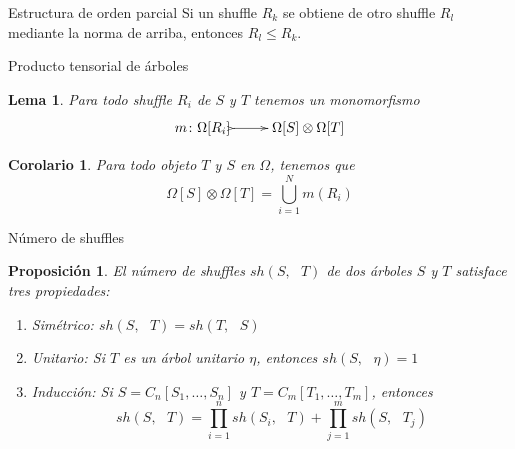 \documentclass[12pt,aspectratio=169]{beamer}
\numberwithin{equation}{section}
\newtheorem{prop}[teo]{Proposici\'on}
\newtheorem{corol}[teo]{Corolario}
\newtheorem{lema}[teo]{Lema}
\theoremstyle{definition}
\begin{document}
{\begin{frame}{Estructura de orden parcial}
    Si un shuffle $R_k$ se obtiene de otro shuffle $R_l$ mediante la norma de arriba, entonces $R_l\le R_k$.
\end{frame}

\begin{frame}{Producto tensorial de \'arboles}
    \begin{lema}
        Para todo shuffle $R_i$ de $S$ y $T$ tenemos un monomorfismo
        $$
            \xymatrix{
                m\colon\Omega[R_i] \ar@{>->}[r] & \Omega[S]\otimes\Omega[T]
            }
        $$
    \end{lema}

    \begin{corol}
        Para todo objeto $T$ y $S$ en $\Omega$, tenemos que
        $$
            \Omega[S]\otimes\Omega[T] = \bigcup_{i=1}^{N} m(R_i)
        $$
    \end{corol}
\end{frame}
\begin{frame}{N\'umero de shuffles}
    \begin{prop}
        El n\'umero de shuffles $sh(S,\text{ }T)$ de dos \'arboles $S$ y $T$ satisface tres propiedades:
        \begin{enumerate}
            \item[{\rm (i)}] Sim\'etrico: $sh(S, \text{ }T) = sh(T, \text{ }S)$
            \item[{\rm (ii)}] Unitario: Si $T$ es un \'arbol unitario $\eta$, entonces $sh(S, \text{ }\eta)=1$
            \item[{\rm (iii)}] Inducci\'on: Si $S=C_n[S_1,\dots,S_n]$ y $T=C_m[T_1,\dots,T_m]$, entonces
                  $$
                      sh(S, \text{ }T)  = \prod_{i=1}^n sh(S_i, \text{ }T) + \prod_{j=1}^m sh(S, \text{ }T_j)
                  $$
        \end{enumerate}
    \end{prop}
\end{frame}

}
\end{document}
